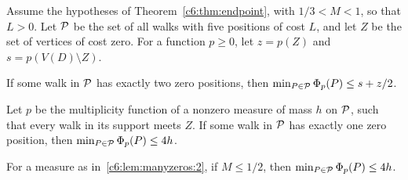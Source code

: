 \begin{lemma}
\label{c6:lem:manyzeros}\label{c6:lem:onezero}\label{c6:cor:normalized}
Assume the hypotheses of Theorem~\ref{c6:thm:endpoint}, with
$1/3<M<1$, so that $L>0$. Let $\mathcal P$ be the set of all walks with five positions of cost $L$, and let
$Z$ be the set of vertices of cost zero. For a function $p\ge0$, let $z=p(Z)$ and $s=p(V(D)\setminus Z)$.
\begin{props}
\item\label{c6:lem:manyzeros:1} If some walk in $\mathcal P$ has exactly two zero positions,
then $\min_{P\in\mathcal P}\Phi_p(P)\le s+z/2$.
\item\label{c6:lem:manyzeros:2} Let $p$ be the multiplicity function of a nonzero measure of mass $h$ on
$\mathcal P$, such that every walk in its support meets $Z$. If some walk in $\mathcal P$ has exactly one zero position, then $\min_{P\in\mathcal P}\Phi_p(P)\le4h$.
\item\label{c6:lem:manyzeros:3} For a measure as in~\ref{c6:lem:manyzeros:2}, if $M\le1/2$, then
$\min_{P\in\mathcal P}\Phi_p(P)\le4h$.
\end{props}
\end{lemma}
